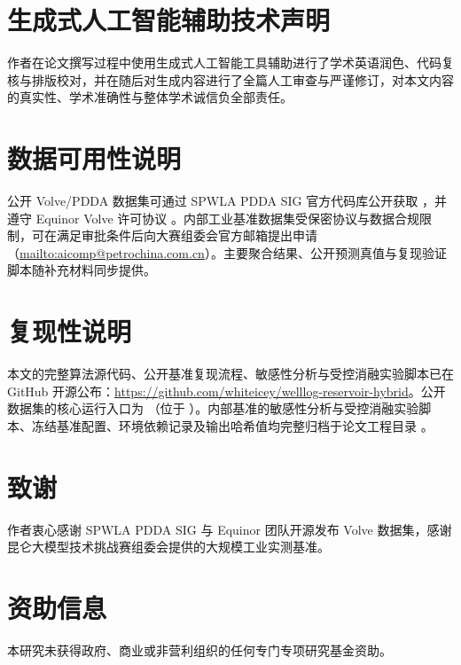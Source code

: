 \documentclass[preprint,12pt,nopreprintline]{elsarticle}
\begin{document}
\section*{生成式人工智能辅助技术声明}
作者在论文撰写过程中使用生成式人工智能工具辅助进行了学术英语润色、代码复核与排版校对，并在随后对生成内容进行了全篇人工审查与严谨修订，对本文内容的真实性、学术准确性与整体学术诚信负全部责任。

\section*{数据可用性说明}
公开 Volve/PDDA 数据集可通过 SPWLA PDDA SIG 官方代码库公开获取 \cite{pddasig2021}，并遵守 Equinor Volve 许可协议 \cite{volve2018}。内部工业基准数据集受保密协议与数据合规限制，可在满足审批条件后向大赛组委会官方邮箱提出申请（\url{mailto:aicomp@petrochina.com.cn}）。主要聚合结果、公开预测真值与复现验证脚本随补充材料同步提供。

\section*{复现性说明}
本文的完整算法源代码、公开基准复现流程、敏感性分析与受控消融实验脚本已在 GitHub 开源公布：\url{https://github.com/whiteicey/welllog-reservoir-hybrid}。公开数据集的核心运行入口为 {\small{}}（位于 {\small{}}）。内部基准的敏感性分析与受控消融实验脚本、冻结基准配置、环境依赖记录及输出哈希值均完整归档于论文工程目录 {\small{}}。

\section*{致谢}
作者衷心感谢 SPWLA PDDA SIG 与 Equinor 团队开源发布 Volve 数据集，感谢昆仑大模型技术挑战赛组委会提供的大规模工业实测基准。

\section*{资助信息}
本研究未获得政府、商业或非营利组织的任何专门专项研究基金资助。


\begingroup
\small
\setlength{\bibsep}{2.5pt}

\endgroup
\end{document}
